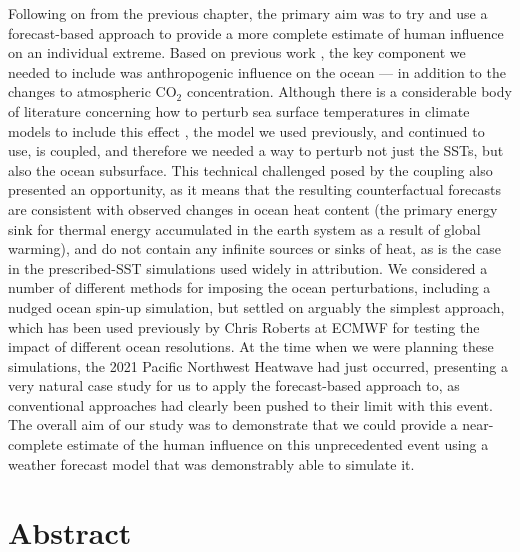   Following on from the previous chapter, the primary aim was to try and use a forecast-based approach to provide a more complete estimate of human influence on an individual extreme. Based on previous work \citep{pall_anthropogenic_2011}, the key component we needed to include was anthropogenic influence on the ocean --- in addition to the changes to atmospheric CO$_2$ concentration. Although there is a considerable body of literature concerning how to perturb sea surface temperatures in climate models to include this effect \citep{stone_benchmark_2021}, the model we used previously, and continued to use, is coupled, and therefore we needed a way to perturb not just the SSTs, but also the ocean subsurface. This technical challenged posed by the coupling also presented an opportunity, as it means that the resulting counterfactual forecasts are consistent with observed changes in ocean heat content (the primary energy sink for thermal energy accumulated in the earth system as a result of global warming), and do not contain any infinite sources or sinks of heat, as is the case in the prescribed-SST simulations used widely in attribution. We considered a number of different methods for imposing the ocean perturbations, including a nudged ocean spin-up simulation, but settled on arguably the simplest approach, which has been used previously by Chris Roberts at ECMWF for testing the impact of different ocean resolutions. At the time when we were planning these simulations, the 2021 Pacific Northwest Heatwave had just occurred, presenting a very natural case study for us to apply the forecast-based approach to, as conventional approaches had clearly been pushed to their limit with this event. The overall aim of our study was to demonstrate that we could provide a near-complete estimate of the human influence on this unprecedented event using a weather forecast model that was demonstrably able to simulate it.

\section{Abstract}

